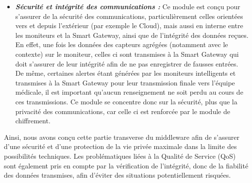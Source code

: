 \begin{itemize}
\item \textbf{\textit{Sécurité et intégrité des communications :}} Ce module est conçu pour s'assurer de la sécurité des communications, particulièrement celles orientées vers et depuis l'extérieur (par exemple le Cloud), mais aussi en interne entre les moniteurs et la Smart Gateway, ainsi que de l'intégrité des données reçues. En effet, une fois les données des capteurs agrégées (notamment avec le contexte) sur le moniteur, celles ci sont transmises à la Smart Gateway qui doit s'assurer de leur intégrité afin de ne pas enregistrer de fausses entrées. De même, certaines alertes étant générées par les moniteurs intelligents et transmises à la Smart Gateway pour leur transmission finale vers l'équipe médicale, il est important qu'aucun renseignement ne soit perdu au cours de ces transmissions. Ce module se concentre donc sur la sécurité, plus que la privacité des communications, car celle ci est renforcée par le module de chiffrement.\\
\end{itemize}
Ainsi, nous avons conçu cette partie transverse du middleware afin de s'assurer d'une sécurité et d'une protection de la vie privée maximale dans la limite des possibilités techniques. Les problématiques liées à la Qualité de Service (QoS) sont également pris en compte par la vérification de l'intégrité, donc de la fiabilité des données transmises, afin d'éviter des situations potentiellement risquées.